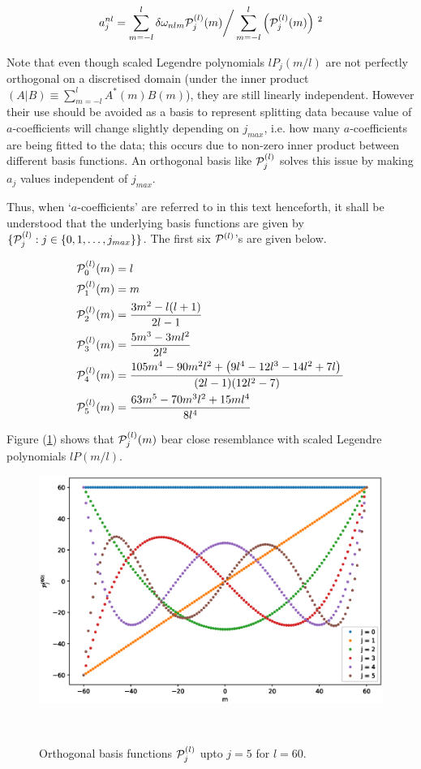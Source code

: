 \begin{equation}
a^{nl}_j = \sum_{m=-l}^l \delta\omega_{nlm}\mathcal{P}^{(l)}_j(m) \bigg/ \sum_{m=-l}^l \left( \mathcal{P}^{(l)}_j(m) \right)\,^2
\end{equation}


Note that even though scaled Legendre polynomials $lP_j(m/l)$ are not perfectly orthogonal on a discretised domain (under the inner product $(A|B)\equiv\sum_{m=-l}^l A^*(m)B(m)$), they are still linearly independent. However their use should be avoided as a basis to represent splitting data because value of $a$-coefficients will change slightly depending on $j_{max}$, i.e. how many $a$-coefficients are being fitted to the data; this occurs due to non-zero inner product between different basis functions. An orthogonal basis like $\mathcal{P}^{(l)}_j$ solves this issue by making $a_j$ values independent of $j_{max}$.

Thus, when `$a$-coefficients' are referred to in this text henceforth, it shall be understood that the underlying basis functions are given by $\{\mathcal{P}^{(l)}_j: j\in \{0,1,\dots,j_{max}\}\}$. The first six $\mathcal{P}^{(l)}$'s are given below.

\begin{align}
\mathcal{P}^{(l)}_{0}(m) &= l \\
\mathcal{P}^{(l)}_1(m) &= m \\
\mathcal{P}^{(l)}_2(m) &= \frac{3m^2-l(l+1)}{2l-1} \\
\mathcal{P}^{(l)}_3(m) &= \frac{5m^3-3ml^2}{2l^2} \\
\mathcal{P}^{(l)}_4(m) &= \frac{105m^4 - 90m^2 l^2 + \left( 9l^4 -12l^3 -14l^2+ 7l \right)\,}{(2l-1)(12l^2-7)} \\
\mathcal{P}^{(l)}_5(m) &= \frac{63m^5 - 70m^3l^2 + 15ml^4}{8l^4}
\end{align}

Figure (\ref{fig:curly_p}) shows that $\mathcal{P}^{(l)}_j(m)$ bear close resemblance with scaled Legendre polynomials $lP(m/l)$.
\begin{figure}[h]
\includegraphics[scale=0.6, center]{Chapter1/figs/curly_p}
\caption{Orthogonal basis functions $\mathcal{P}^{(l)}_{j}$ upto $j=5$ for $l=60$.}\
\label{fig:curly_p}
\end{figure}
